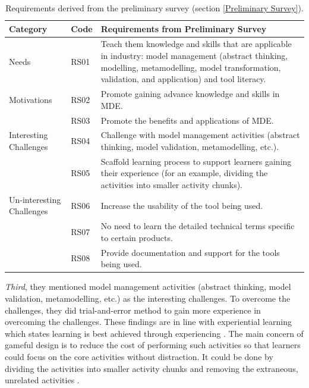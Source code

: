 \documentclass[12pt, a4paper]{report} \usepackage[titletoc]{appendix}
\begin{document}
\begin{table}[ht]
\caption{Requirements derived from the preliminary survey (section \ref{Preliminary Survey}).}
\label{table:preliminary-survey}
\begin{center}
\begin{tabular}{ p{2cm}p{1cm}p{10cm} } 
\hline
Category & Code & Requirements from Preliminary Survey \\
\hline
\multirow{1}{2cm}{Needs} 
& RS01 & Teach them knowledge and skills that are applicable in industry: model management (abstract thinking, modelling, metamodelling, model transformation, validation, and application) and tool literacy. \\ 
\hline
\multirow{1}{2cm}{Motivations}
& RS02 & Promote gaining advance knowledge and skills in MDE. \\ 
& RS03 & Promote the benefits and applications of MDE. \\ 
\hline
\multirow{1}{2cm}{Interesting Challenges}
& RS04 & Challenge with model management activities (abstract thinking, model validation, metamodelling, etc.). \\ 
& RS05 & Scaffold learning process to support learners gaining their experience (for an example, dividing the activities into smaller activity chunks). \\ 
\hline
\multirow{1}{2cm}{Un-interesting Challenges}
& RS06 & Increase the usability of the tool being used. \\ 
& RS07 & No need to learn the detailed technical terms specific to certain products. \\ 
& RS08 & Provide documentation and support for the tools being used. \\ 
\hline
\end{tabular}
\end{center}
\end{table}


\textit{Third}, they mentioned model management activities (abstract thinking, model validation, metamodelling, etc.) as the interesting challenges. To overcome the challenges, they did trial-and-error method to gain more experience in overcoming the challenges. These findings are in line with experiential learning which states learning is best achieved through experiencing \cite{kolb2014experiential}. The main concern of gameful design is to reduce the cost of performing such activities so that learners could focus on the core activities without distraction. It could be done by dividing the activities into smaller activity chunks and removing the extraneous, unrelated activities \cite{deterding2015lens}. 
\end{document}
